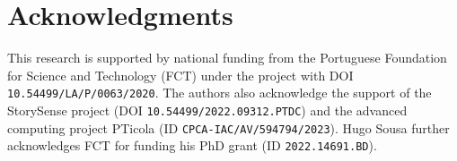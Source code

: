 \section*{Acknowledgments}

This research is supported by national funding from the Portuguese Foundation for Science and Technology (FCT) under the project with DOI \texttt{\small 10.54499/LA/P/0063/2020}. The authors also acknowledge the support of the StorySense project (DOI \texttt{\small 10.54499/2022.09312.PTDC}) and the advanced computing project PTicola (ID \texttt{\small CPCA-IAC/AV/594794/2023}). Hugo Sousa further acknowledges FCT for funding his PhD grant (ID \texttt{\small 2022.14691.BD}).
